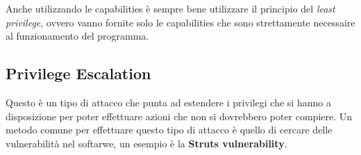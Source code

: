 Anche utilizzando le capabilities è sempre bene utilizzare il principio del
\textit{least privilege}, ovvero vanno fornite solo le capabilities che sono
strettamente necessaire al funzionamento del programma.

\subsection{Privilege Escalation}

Questo è un tipo di attacco che punta ad estendere i privilegi che si hanno a
disposizione per poter effettuare azioni che non si dovrebbero poter compiere.
Un metodo comune per effettuare questo tipo di attacco è quello di cercare delle
vulnerabilità nel softarwe, un esempio è la \textbf{Struts vulnerability}.